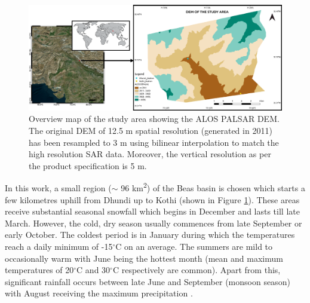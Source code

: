 \documentclass[review]{elsarticle}
\numberwithin{equation}{section}
\numberwithin{figure}{section}
\numberwithin{table}{section}
\begin{document}
\begin{figure}[htb]
    \centering
    \includegraphics[width=\textwidth]{Figures/Overview.png}
    \caption{Overview map of the study area showing the ALOS PALSAR DEM. The original DEM of 12.5 m spatial resolution (generated in 2011) has been resampled to 3 m using bilinear interpolation \citep{Wu2008} to match the high resolution SAR data. Moreover, the vertical resolution as per the product specification is 5 m.}
    \label{fig:overview}
\end{figure}

In this work, a small region ($\sim$ 96 km\textsuperscript{2}) of the Beas basin is chosen which starts a few kilometres uphill from Dhundi up to Kothi (shown in Figure \ref{fig:overview}). These areas receive substantial seasonal snowfall which begins in December and lasts till late March. However, the cold, dry season usually commences from late September or early October. The coldest period is in January during which the temperatures reach a daily minimum of -15$^\circ$C on an average. The summers are mild to occasionally warm with June being the hottest month (mean and maximum temperatures of 20$^\circ$C and 30$^\circ$C respectively are common). Apart from this, significant rainfall occurs between late June and September (monsoon season) with August receiving the maximum precipitation \citep{Majumdar2019, Thakur2012}.
\end{document}
